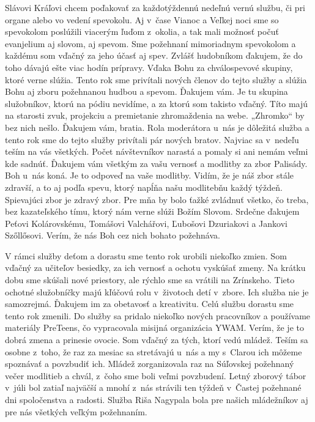 {\bi Slávovi Kráľovi} chcem poďakovať za každotýždennú nedeľnú vernú službu, či pri organe alebo vo vedení {\bi spevokolu}. Aj v~čase Vianoc a Veľkej noci sme so spevokolom  poslúžili viacerým ľuďom z~okolia, a tak mali možnosť počuť evanjelium aj slovom, aj spevom. Sme požehnaní mimoriadnym spevokolom a každému som vďačný za jeho účasť aj spev. Zvlášť {\bi hudobníkom} ďakujem, že do toho dávajú ešte viac hodín prípravy. Vďaka Bohu za {\bi chválospevové skupiny}, ktoré verne slúžia. Tento rok sme privítali nových členov do tejto služby a slúžia Bohu aj zboru požehnanou hudbou a spevom. Ďakujem vám. Je tu skupina služobníkov, ktorú na pódiu nevidíme, a za ktorú som takisto vďačný. Títo majú na starosti {\bi zvuk}, {\bi projekciu} a {\bi premietanie} zhromaždenia na webe. „Zhromko“ by bez nich nešlo. Ďakujem vám, bratia. Rola {\bi moderátora} u~nás je dôležitá služba a tento rok sme do tejto služby  privítali pár nových bratov. Najviac sa v~nedeľu teším na {\bi vás všetkých}. Počet návštevníkov narastá a pomaly si ani nemám veľmi kde sadnúť. Ďakujem vám všetkým za vašu vernosť a modlitby za zbor Palisády. Boh u~nás koná. Je to odpoveď na vaše {\bi modlitby}. Vidím, že je náš zbor stále zdravší, a to aj podľa spevu, ktorý napĺňa našu modlitebňu každý týždeň. Spievajúci zbor je zdravý zbor.  Pre mňa by bolo ťažké zvládnuť všetko, čo treba,  bez {\bi kazateľského tímu}, ktorý nám verne slúži  Božím Slovom. Srdečne ďakujem Peťovi Kolárovskému, Tomášovi Valchářovi, Ľubošovi Dzuriakovi a Jankovi Szőllősovi. Verím, že nás Boh cez nich bohato požehnáva.

V rámci služby deťom a dorastu sme tento rok urobili  niekoľko zmien. Som vďačný za učiteľov {\bi besiedky}, za ich vernosť a ochotu vyskúšať zmeny. Na krátku dobu sme skúšali nové priestory, ale rýchlo sme sa vrátili na Zrínskeho. Tieto ochotné služobníčky majú kľúčovú rolu v~životoch detí v~zbore. Ich služba nie je samozrejmá. Ďakujem im za obetavosť a kreativitu. Celú službu {\bi dorastu} sme tento rok zmenili.  Do služby sa pridalo niekoľko nových pracovníkov a používame materiály PreTeens, čo vypracovala misijná organizácia YWAM. Verím, že je to dobrá zmena a prinesie ovocie. Som vďačný za tých, ktorí vedú  {\bi mládež}. Teším sa osobne z~toho, že raz za mesiac sa stretávajú u~nás a my s~Clarou ich môžeme spoznávať a povzbudiť ich. Mládež zorganizovala raz na Súľovskej požehnaný večer modlitieb a chvál, z~čoho sme boli veľmi povzbudení. {\bi Letný zborový tábor} v~júli bol zatiaľ najväčší a mnohí z~nás strávili ten týždeň v~Častej požehnané dni spoločenstva a radosti. Služba Riša Nagypala bola pre našich mládežníkov aj pre nás všetkých veľkým požehnaním.

